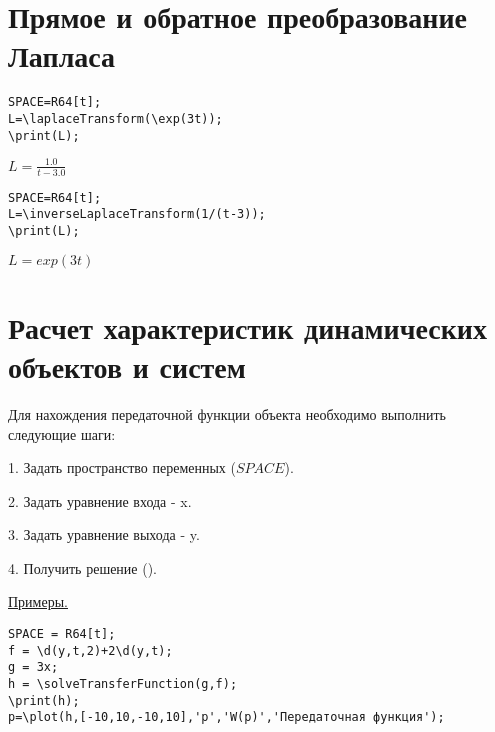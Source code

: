 \section{Прямое и обратное преобразование Лапласа}

\begin{verbatim}
SPACE=R64[t];
L=\laplaceTransform(\exp(3t));
\print(L);
\end{verbatim}

{$L = \frac {1.0}{t - 3.0}$}

\begin{verbatim}
SPACE=R64[t];
L=\inverseLaplaceTransform(1/(t-3));
\print(L);
\end{verbatim}

{$L = exp(3t)$}

\section{Расчет характеристик динамических объектов и систем}
Для нахождения передаточной функции объекта необходимо выполнить следующие шаги:

1. Задать пространство переменных ($SPACE$). 

2. Задать уравнение входа - x. 

3. Задать уравнение выхода - y. 

4. Получить решение (). 


\underline{Примеры. }

\vspace*{-2mm}

\begin{verbatim}
SPACE = R64[t]; 
f = \d(y,t,2)+2\d(y,t); 
g = 3x; 
h = \solveTransferFunction(g,f); 
\print(h);
p=\plot(h,[-10,10,-10,10],'p','W(p)','Передаточная функция'); 
\end{verbatim}


